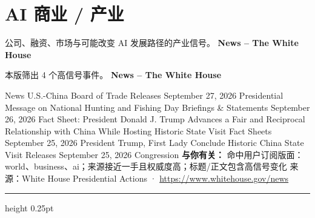 \documentclass[10.5pt]{ctexart}
\begin{document}
\section*{AI 商业 / 产业}
{\color{ormuted} 公司、融资、市场与可能改变 AI 发展路径的产业信号。}
\vspace{2mm}
{\LARGE\bfseries News – The White House}\par
\vspace{1mm}
{\color{ormuted} 本版筛出 4 个高信号事件。}
\vspace{3mm}
{\Large\bfseries News – The White House}\par
News U.S.-China Board of Trade Releases September 27, 2026 Presidential Message on National Hunting and Fishing Day Briefings \& Statements September 26, 2026 Fact Sheet: President Donald J. Trump Advances a Fair and Reciprocal Relationship with China While Hosting Historic State Visit Fact Sheets September 25, 2026 President Trump, First Lady Conclude Historic China State Visit Releases September 25, 2026 Congression
\textbf{与你有关：} 命中用户订阅版面：world、business、ai；来源接近一手且权威度高；标题/正文包含高信号变化
{\footnotesize\color{ormuted} 来源：White House Presidential Actions · \url{https://www.whitehouse.gov/news}}
\vspace{4mm}
\hrule height 0.25pt
\vspace{3mm}
\end{document}
